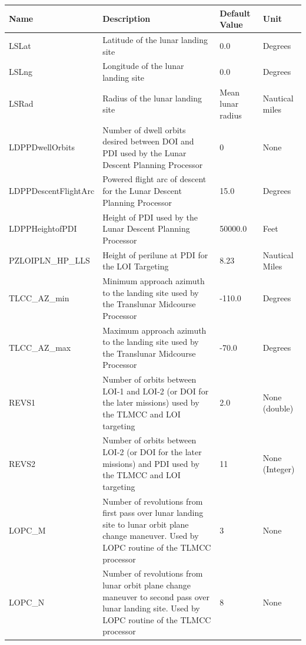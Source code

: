 \documentclass[11pt]{article} %
\begin{document}
\begin{tabular}{L{3.7cm} L{7cm} L{1.95cm} L{1.5cm}}
\hline
\textbf{Name} & \textbf{Description} & \textbf{Default Value} & \textbf{Unit}\\
\hline
LSLat & Latitude of the lunar landing site & 0.0 & Degrees\\
\hline
LSLng & Longitude of the lunar landing site & 0.0 & Degrees\\
\hline
LSRad & Radius of the lunar landing site & Mean lunar radius & Nautical miles\\
\hline
LDPPDwellOrbits & Number of dwell orbits desired between DOI and PDI used by the Lunar Descent Planning Processor & 0 & None\\
\hline
LDPPDescentFlightArc & Powered flight arc of descent for the Lunar Descent Planning Processor & 15.0 & Degrees\\
\hline 
LDPPHeightofPDI & Height of PDI used by the Lunar Descent Planning Processor & 50000.0 & Feet\\
\hline
PZLOIPLN\_HP\_LLS & Height of perilune at PDI for the LOI Targeting & 8.23 & Nautical Miles\\
\hline
TLCC\_AZ\_min & Minimum approach azimuth to the landing site used by the Translunar Midcourse Processor & -110.0 & Degrees\\
\hline
TLCC\_AZ\_max & Maximum approach azimuth to the landing site used by the Translunar Midcourse Processor & -70.0 & Degrees\\
\hline
REVS1 & Number of orbits between LOI-1 and LOI-2 (or DOI for the later missions) used by the TLMCC and LOI targeting & 2.0 & None (double)\\
\hline
REVS2 & Number of orbits between LOI-2 (or DOI for the later missions) and PDI used by the TLMCC and LOI targeting & 11 & None (Integer)\\
\hline
LOPC\_M & Number of revolutions from first pass over lunar landing site to lunar orbit plane change maneuver. Used by LOPC routine of the TLMCC processor & 3 & None\\
\hline
LOPC\_N & Number of revolutions from lunar orbit plane change maneuver to second pass over lunar landing site. Used by LOPC routine of the TLMCC processor & 8 & None\\
\hline
\end{tabular}
\end{document}
